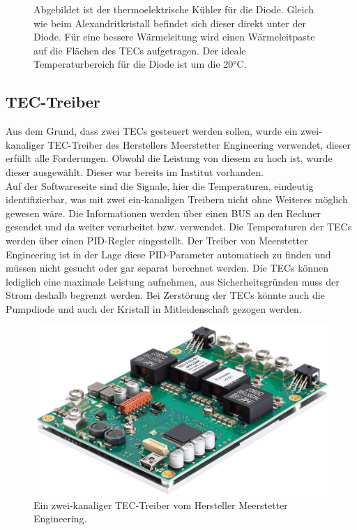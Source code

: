 \begin{figure}
    \centering
    \caption{Abgebildet ist der thermoelektrische Kühler für die Diode. Gleich wie beim Alexandritkristall befindet sich dieser direkt unter der Diode. Für eine bessere Wärmeleitung wird einen Wärmeleitpaste auf die Flächen des TECs aufgetragen. Der ideale Temperaturbereich für die Diode ist um die 20°C.}
    \label{fig:tec_di_hw}
\end{figure}

\subsection{TEC-Treiber}
\label{label_tec_treiber}
Aus dem Grund, dass zwei TECs gesteuert werden sollen, wurde ein zwei-kanaliger TEC-Treiber des Herstellers Meerstetter Engineering verwendet, dieser erfüllt alle Forderungen. Obwohl die Leistung von diesem zu hoch ist, wurde dieser ausgewählt. Dieser war bereits im Institut vorhanden.\\
Auf der Softwareseite sind die Signale, hier die Temperaturen, eindeutig identifizierbar, was mit zwei ein-kanaligen Treibern nicht ohne Weiteres möglich gewesen wäre. Die Informationen werden über einen BUS an den Rechner gesendet und da weiter verarbeitet bzw. verwendet.
Die Temperaturen der TECs werden über einen PID-Regler eingestellt. Der Treiber von Meerstetter Engineering ist in der Lage diese PID-Parameter automatisch zu finden und müssen nicht gesucht oder gar separat berechnet werden. Die TECs können lediglich eine maximale Leistung aufnehmen, aus Sicherheitsgründen muss der Strom deshalb begrenzt werden. Bei Zerstörung der TECs könnte auch die Pumpdiode und auch der Kristall in Mitleidenschaft gezogen werden.\\

\begin{figure}[H]
    \centering
    \includegraphics[scale=0.2]{98_images/tec_controller_real_isometry_meerstetter.PNG}
    \caption{Ein zwei-kanaliger TEC-Treiber vom Hersteller Meerstetter Engineering.}
    \label{fig:tec_treiber_hw}
\end{figure}


